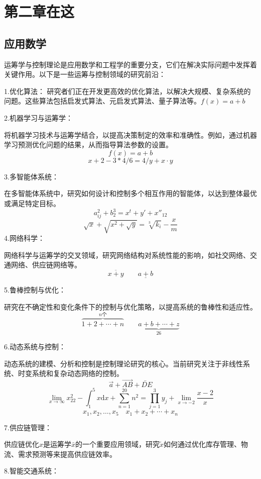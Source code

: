 \chapter{第二章在这}\label{chap:Second}

\section{应用数学 \cite{XDTQ202311016}}

运筹学与控制理论是应用数学和工程学的重要分支，它们在解决实际问题中发挥着关键作用。以下是一些运筹与控制领域的研究前沿\cite{ZNJS202204001}：

1.优化算法：
研究者们正在开发更高效的优化算法，以解决大规模、复杂系统的问题。这些算法包括启发式算法、元启发式算法、量子算法等。$ f(x) = a+b $

2.机器学习与运筹学：

将机器学习技术与运筹学结合，以提高决策制定的效率和准确性。例如，通过机器学习预测优化问题的结果，从而指导算法参数的设置。
$$ f(x) = a+b $$
$$ x+2-3*4/6=4/y + x\cdot y $$

3.多智能体系统：

在多智能体系统中，研究如何设计和控制多个相互作用的智能体，以达到整体最优或满足特定目标。
$$ a_{ij}^{2} + b^3_{2}=x^{t} + y' + x''_{12} $$
$$\sqrt{x} + \sqrt{x^{2}+\sqrt{y}} = \sqrt[3]{k_{i}} - \frac{x}{m}$$
4.网络科学：

网络科学与运筹学的交叉领域，研究网络结构对系统性能的影响，如社交网络、交通网络、供应链网络等。
$$\overline{x+y} \qquad \underline{a+b}$$

5.鲁棒控制与优化：

研究在不确定性和变化条件下的控制与优化策略，以提高系统的鲁棒性和适应性。
$$\overbrace{1+2+\cdots+n}^{n个} \qquad \underbrace{a+b+\cdots+z}_{26}$$

6.动态系统与控制：

动态系统的建模、分析和控制是控制理论研究的核心。当前研究关注于非线性系统、时变系统和复杂动态网络的控制。
$$\vec{a} + \overrightarrow{AB} + \overleftarrow{DE}$$
$$  \lim_{x \to \infty} x^2_{22} - \int_{1}^{5}x\mathrm{d}x + \sum_{n=1}^{20} n^{2} = \prod_{j=1}^{3} y_{j}  + \lim_{x \to -2} \frac{x-2}{x} $$
$$ x_{1},x_{2},\ldots,x_{5}  \quad x_{1} + x_{2} + \cdots + x_{n} $$

7.供应链管理：

供应链优化$ \hat{x} $是运筹学$ \bar{x} $的一个重要应用领域，研究$ \tilde{x} $如何通过优化库存管理、物流、需求预测等来提高供应链效率。

8.智能交通系统：

